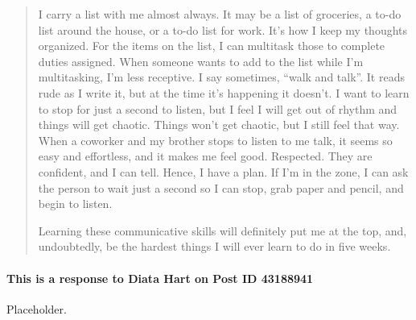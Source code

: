 \begin{quotation}
      I carry a list with me almost always. It may be a list of groceries, a
        to-do list around the house, or a to-do list for work. It's how I keep
        my thoughts organized. For the items on the list, I can multitask those
        to complete duties assigned. When someone wants to add to the list while
        I'm multitasking, I'm less receptive. I say sometimes,
        ``walk and talk''. It reads rude as I write it, but at the time it's
        happening it doesn't. I want to learn to stop for just a second to
        listen, but I feel I will get out of rhythm and things will get chaotic.
        Things won't get chaotic, but I still feel that way. When a coworker and
        my brother stops to listen to me talk, it seems so easy and effortless,
        and it makes me feel good. Respected. They are confident, and I can
        tell. Hence, I have a plan. If I'm in the zone, I can ask the person to
        wait just a second so I can stop, grab paper and pencil, and begin to
        listen.

      Learning these communicative skills will definitely put me at the top,
        and, undoubtedly, be the hardest things I will ever learn to do in five
        weeks.
    \end{quotation}

    \paragraph{This is a response to Diata Hart on Post ID 43188941}
      Placeholder.

